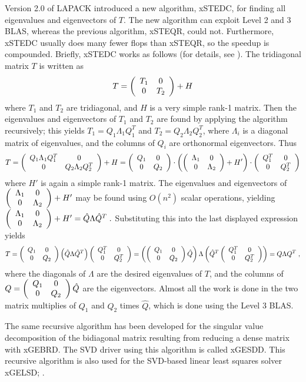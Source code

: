 Version 2.0 of LAPACK introduced a new algorithm,
xSTEDC,
for finding all eigenvalues and
eigenvectors of $T$. The new algorithm can exploit Level 2 and 3 BLAS,
whereas
the previous algorithm,
xSTEQR,
could not. Furthermore, xSTEDC usually does
many
fewer flops than xSTEQR, so the speedup is compounded. Briefly, xSTEDC works
as follows
(for details, see \cite{gueisenstat,rutter}). The tridiagonal matrix $T$ is
written as
\[
T = \bmat{cc} T_1 & 0 \\ 0 & T_2 \emat + H
\]
where $T_1$ and $T_2$ are tridiagonal, and $H$ is a very simple rank-1
matrix.
Then the eigenvalues and eigenvectors of $T_1$ and $T_2$ are found by
applying
the algorithm recursively; this yields $T_1 = Q_1 \Lambda_1 Q_1^T$ and
$T_2 = Q_2 \Lambda_2 Q_2^T$, where $\Lambda_i$ is a diagonal matrix of
eigenvalues,
and the columns of $Q_i$ are orthonormal eigenvectors. Thus
\[
T = \bmat{cc} Q_1 \Lambda_1 Q_1^T & 0 \\ 0 &  Q_2 \Lambda_2 Q_2^T \emat + H
=
\bmat{cc} Q_1 & 0 \\ 0 & Q_2 \emat \cdot
\left( \bmat{cc} \Lambda_1 & 0 \\ 0 & \Lambda_2 \emat + H' \right) \cdot
\bmat{cc} Q_1^T & 0 \\ 0 & Q_2^T \emat
\]
where $H'$ is again a simple rank-1 matrix. The eigenvalues and
eigenvectors
of $\bmat{cc} \Lambda_1 & 0 \\ 0 & \Lambda_2 \emat + H'$ may be found
using $O(n^2)$ scalar operations, yielding
$
\bmat{cc} \Lambda_1 & 0 \\ 0 & \Lambda_2 \emat + H' =
\hat{Q} \Lambda \hat{Q}^T \; .
$
Substituting this into the last displayed expression yields
\[
T =
\bmat{cc} Q_1 & 0 \\ 0 & Q_2 \emat
\left( \hat{Q} {\Lambda} \hat{Q}^T \right) \bmat{cc} Q_1^T & 0 \\ 0 & Q_2^T
\emat =
\left( \bmat{cc} Q_1 & 0 \\ 0 & Q_2 \emat \hat{Q} \right)
{\Lambda}
\left( \hat{Q}^T \bmat{cc} Q_1^T & 0 \\ 0 & Q_2^T \emat \right) =
Q \Lambda Q^T \; ,
\]
where the diagonals of $\Lambda$ are the desired eigenvalues of $T$, and the
columns
of $Q = \bmat{cc} Q_1 & 0 \\ 0 & Q_2 \emat \hat{Q}$ are the eigenvectors.
Almost all the work is done in the two matrix multiplies of $Q_1$ and $Q_2$
times
$\hat{Q}$, which is done using the Level 3 BLAS.

The same recursive algorithm has been developed for the singular value
decomposition
of the bidiagonal matrix resulting from reducing a dense matrix with
xGEBRD.
The SVD driver using this algorithm is called xGESDD.
This recursive algorithm is also used for the SVD-based linear least
squares solver xGELSD;
.

